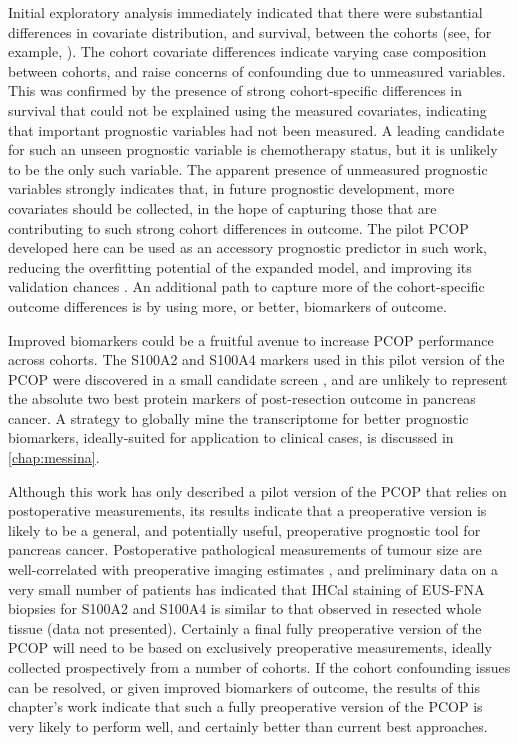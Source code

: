 \documentclass[dissertation.tex]{subfiles}
\begin{document}
Initial exploratory analysis immediately indicated that there were substantial differences in covariate distribution, and survival, between the cohorts (see, for example, ).  The cohort covariate differences indicate varying case composition between cohorts, and raise concerns of confounding due to unmeasured variables.  This was confirmed by the presence of strong cohort-specific differences in survival that could not be explained using the measured covariates, indicating that important prognostic variables had not been measured.  A leading candidate for such an unseen prognostic variable is chemotherapy status, but it is unlikely to be the only such variable.  The apparent presence of unmeasured prognostic variables strongly indicates that, in future prognostic development, more covariates should be collected, in the hope of capturing those that are contributing to such strong cohort differences in outcome.  The pilot \gls{PCOP} developed here can be used as an accessory prognostic predictor in such work, reducing the overfitting potential of the expanded model, and improving its validation chances \cite{VanHouwelingen2000}.  An additional path to capture more of the cohort-specific outcome differences is by using more, or better, biomarkers of outcome.

Improved biomarkers could be a fruitful avenue to increase \gls{PCOP} performance across cohorts.  The S100A2 and S100A4 markers used in this pilot version of the \gls{PCOP} were discovered in a small candidate screen \cite{Biankin2009, Biankin2009b}, and are unlikely to represent the absolute two best protein markers of post-resection outcome in pancreas cancer.  A strategy to globally mine the transcriptome for better prognostic biomarkers, ideally-suited for application to clinical cases, is discussed in \cref{chap:messina}.

Although this work has only described a pilot version of the \gls{PCOP} that relies on postoperative measurements, its results indicate that a preoperative version is likely to be a general, and potentially useful, preoperative prognostic tool for pancreas cancer.  Postoperative pathological measurements of tumour size are well-correlated with preoperative imaging estimates \cite{Arvold2011}, and preliminary data on a very small number of patients has indicated that \gls{IHCal} staining of \gls{EUS}-\gls{FNA} biopsies for S100A2 and S100A4 is similar to that observed in resected whole tissue (data not presented).  Certainly a final fully preoperative version of the \gls{PCOP} will need to be based on exclusively preoperative measurements, ideally collected prospectively from a number of cohorts.  If the cohort confounding issues can be resolved, or given improved biomarkers of outcome, the results of this chapter's work indicate that such a fully preoperative version of the \gls{PCOP} is very likely to perform well, and certainly better than current best approaches.
\end{document}
